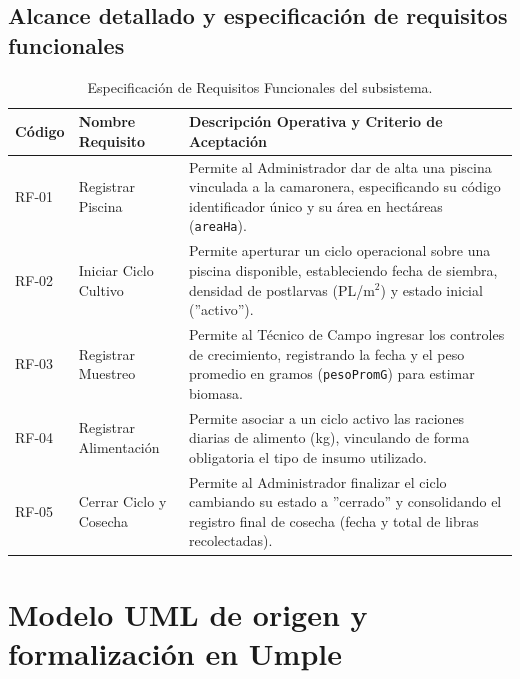 \documentclass[11pt,a4paper]{article}
\begin{document}
\subsection{Alcance detallado y especificaci\'on de requisitos funcionales}

\begin{table}[H]
\centering
\small
\begin{tabular}{p{2cm}p{4cm}p{8cm}}
\toprule
\textbf{C\'odigo} & \textbf{Nombre Requisito} & \textbf{Descripci\'on Operativa y Criterio de Aceptaci\'on} \\
\midrule
RF-01 & Registrar Piscina & Permite al Administrador dar de alta una piscina vinculada a la camaronera, especificando su c\'odigo identificador \'unico y su \'area en hect\'areas (\texttt{areaHa}). \\
RF-02 & Iniciar Ciclo Cultivo & Permite aperturar un ciclo operacional sobre una piscina disponible, estableciendo fecha de siembra, densidad de postlarvas (PL/m$^2$) y estado inicial (''activo''). \\
RF-03 & Registrar Muestreo & Permite al T\'ecnico de Campo ingresar los controles de crecimiento, registrando la fecha y el peso promedio en gramos (\texttt{pesoPromG}) para estimar biomasa. \\
RF-04 & Registrar Alimentaci\'on & Permite asociar a un ciclo activo las raciones diarias de alimento (kg), vinculando de forma obligatoria el tipo de insumo utilizado. \\
RF-05 & Cerrar Ciclo y Cosecha & Permite al Administrador finalizar el ciclo cambiando su estado a ''cerrado'' y consolidando el registro final de cosecha (fecha y total de libras recolectadas). \\
\bottomrule
\end{tabular}
\caption{Especificaci\'on de Requisitos Funcionales del subsistema.}
\end{table}



\section{Modelo UML de origen y formalizaci\'on en Umple}
\label{sec:modelado}
\end{document}
